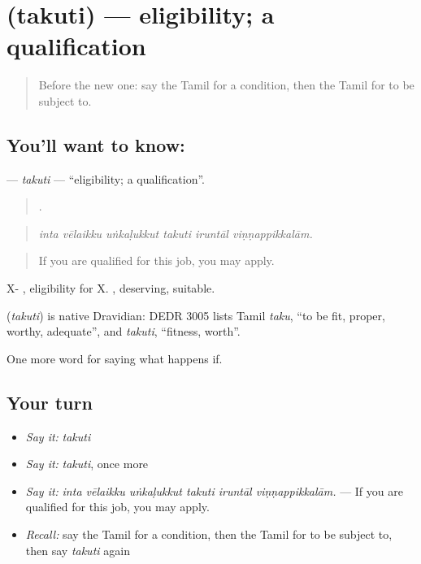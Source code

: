 \section[\texorpdfstring{\ta{தகுதி} (takuti)}{தகுதி (takuti)}]{ (takuti) — eligibility; a qualification}

\label{lesson:TA-C382-takuti}



\begin{quote}
Before the new one: say the Tamil for a condition, then the Tamil for to be subject to.
\end{quote}

\subsection*{You'll want to know: }
\textbf{} — \emph{takuti} — \textquotedblleft{}eligibility; a qualification\textquotedblright{}.

\begin{quote}
     .
\end{quote}

\begin{quote}
\emph{inta vēlaikku uṅkaḷukkut takuti iruntāl viṇṇappikkalām.}
\end{quote}

\begin{quote}
If you are qualified for this job, you may apply.
\end{quote}

X- , eligibility for X. , deserving, suitable.

\begin{cousinweb}
\textbf{} (\emph{takuti}) is native Dravidian: DEDR 3005 lists Tamil \emph{taku}, \textquotedblleft{}to be fit, proper, worthy, adequate\textquotedblright{}, and \emph{takuti}, \textquotedblleft{}fitness, worth\textquotedblright{}.
\end{cousinweb}

\begin{grammarlens}[title={What you've built}]
One more word for saying what happens if.
\end{grammarlens}

\subsection*{Your turn}
\begin{itemize}
\raggedright
  \item \emph{Say it:} \emph{takuti}
  \item \emph{Say it:} \emph{takuti}, once more
  \item \emph{Say it:} \emph{inta vēlaikku uṅkaḷukkut takuti iruntāl viṇṇappikkalām.} — If you are qualified for this job, you may apply.
  \item \emph{Recall:} say the Tamil for a condition, then the Tamil for to be subject to, then say \emph{takuti} again
\end{itemize}

